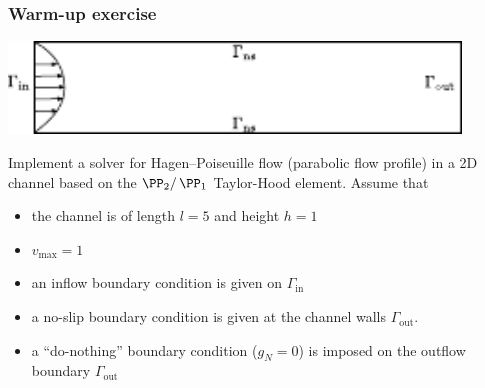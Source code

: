 \begin{frame}
    \frametitle{Warm-up exercise}
    \begin{center}
        \includegraphics[width=0.9\textwidth]{pdf/channel.pdf}
    \end{center}
    Implement a solver for Hagen--Poiseuille flow
    (parabolic flow profile) in a 2D channel based on the
    $\PP_2/\,\PP_1$ Taylor-Hood element. Assume that
    \begin{itemize}
        \item the channel is of length $l = 5$ and height $h = 1$
        \item $v_{\text{max}} = 1$
        \item an inflow boundary condition is given on
            $\Gamma_{\text{in}}$
        \item a no-slip boundary condition is given at the channel
            walls $\Gamma_{\text{out}}$.
        \item a ``do-nothing'' boundary condition ($g_N = 0$) is imposed on the
            outflow boundary $\Gamma_{\text{out}}$
    \end{itemize}
\end{frame}
